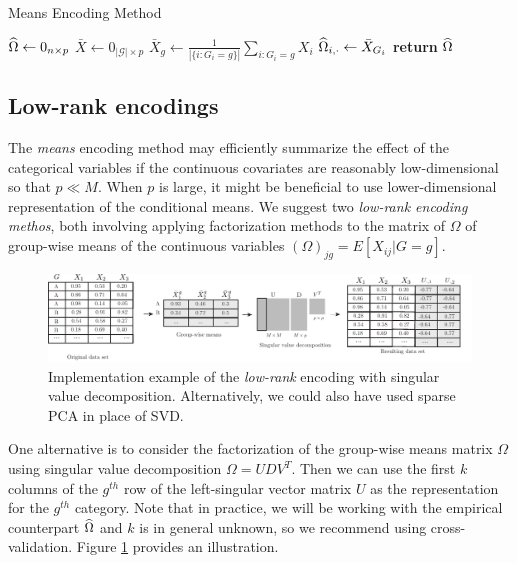 \documentclass{article}
\theoremstyle{plain}
\theoremstyle{definition}
\theoremstyle{remark}
\begin{document}
\begin{algorithm}
\label{alg:means}
\caption{Means Encoding Method}
\begin{algorithmic}[1]
\State $\widehat{\Omega} \gets 0_{n \times p}$
\State $\bar{X} \gets 0_{|\mathcal{G}| \times p}$
\State $\bar{X}_{g} \gets \frac{1}{|\{i:G_{i}=g\}|}\sum_{i:G_{i}=g}X_{i}$
\EndFor
{}
\State $\widehat{\Omega}_{i,\cdot} \gets \bar{X}_{G_{i}}$
\EndFor
\State \textbf{return} $\widehat{\Omega}$
\EndProcedure
\end{algorithmic}
\end{algorithm}





\subsection{Low-rank encodings}
\label{subsec:lowrank}

The \emph{means} encoding method may efficiently summarize the effect of the categorical variables if the continuous covariates are reasonably low-dimensional so that $p \ll M$. When $p$ is large, it might be beneficial to use lower-dimensional representation of the conditional means. We suggest two  \emph{low-rank encoding methos}, both involving applying factorization methods to the matrix of $\Omega$ of group-wise means of the continuous variables $(\Omega)_{jg} = E[X_{ij} | G=g]$.
\begin{figure}[H]
  \centering
  \includegraphics[width=\textwidth]{figures/lowrank_encoding.pdf}
  \caption{Implementation example of the \emph{low-rank} encoding with singular value decomposition. Alternatively, we could also have used sparse PCA in place of SVD.}
  \label{fig:lowrank_encoding}
\end{figure}

One alternative is to consider the factorization of the group-wise means matrix $\Omega$ using singular value decomposition $\Omega = U D V^{T}$. Then we can use the first $k$ columns of the $g^{th}$ row of the left-singular vector matrix $U$ as the representation for the $g^{th}$ category. Note that in practice, we will be working with the empirical counterpart $\widehat{\Omega}$ and $k$ is in general unknown, so we recommend using cross-validation. Figure \ref{fig:lowrank_encoding} provides an illustration.
\end{document}
